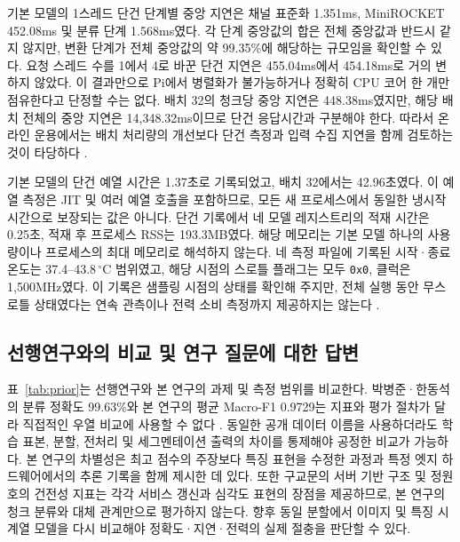 \documentclass[11pt,a4paper]{article}
\newcommand{\sourceproject}{\citep{project2026}}
\newcommand{\smalltable}[1]{\begingroup\small\setlength{\tabcolsep}{5pt}\endgroup}
\begin{document}
\begin{table}[htbp]
\centering
\caption{Pi의 청크당 p50 지연(ms). $t$는 요청 스레드 수, $b$는 배치 크기이다. 배치 8과 32의 값은 전체 배치 지연을 배치 크기로 나눈 처리량 환산값이다.}
\label{tab:latency}
\smalltable{latency.tex}
\end{table}

기본 모델의 1스레드 단건 단계별 중앙 지연은 채널 표준화 1.351ms, MiniROCKET 452.08ms 및 분류 단계 1.568ms였다.
각 단계 중앙값의 합은 전체 중앙값과 반드시 같지 않지만, 변환 단계가 전체 중앙값의 약 99.35\%에 해당하는 규모임을 확인할 수 있다.
요청 스레드 수를 1에서 4로 바꾼 단건 지연은 455.04ms에서 454.18ms로 거의 변하지 않았다.
이 결과만으로 Pi에서 병렬화가 불가능하거나 정확히 CPU 코어 한 개만 점유한다고 단정할 수는 없다.
배치 32의 청크당 중앙 지연은 448.38ms였지만, 해당 배치 전체의 중앙 지연은 14,348.32ms이므로 단건 응답시간과 구분해야 한다.
따라서 온라인 운용에서는 배치 처리량의 개선보다 단건 측정과 입력 수집 지연을 함께 검토하는 것이 타당하다 \sourceproject.

기본 모델의 단건 예열 시간은 1.37초로 기록되었고, 배치 32에서는 42.96초였다.
이 예열 측정은 JIT 및 여러 예열 호출을 포함하므로, 모든 새 프로세스에서 동일한 냉시작 시간으로 보장되는 값은 아니다.
단건 기록에서 네 모델 레지스트리의 적재 시간은 0.25초, 적재 후 프로세스 RSS는 193.3MB였다.
해당 메모리는 기본 모델 하나의 사용량이나 프로세스의 최대 메모리로 해석하지 않는다.
네 측정 파일에 기록된 시작·종료 온도는 37.4--43.8\,${}^{\circ}$C 범위였고, 해당 시점의 스로틀 플래그는 모두 \texttt{0x0}, 클럭은 1,500MHz였다.
이 기록은 샘플링 시점의 상태를 확인해 주지만, 전체 실행 동안 무스로틀 상태였다는 연속 관측이나 전력 소비 측정까지 제공하지는 않는다 \sourceproject.

\subsection{선행연구와의 비교 및 연구 질문에 대한 답변}
표~\ref{tab:prior}는 선행연구와 본 연구의 과제 및 측정 범위를 비교한다.
박병준·한동석의 분류 정확도 99.63\%와 본 연구의 평균 Macro-F1 0.9729는 지표와 평가 절차가 달라 직접적인 우열 비교에 사용할 수 없다 \citep{park2024}.
동일한 공개 데이터 이름을 사용하더라도 학습 표본, 분할, 전처리 및 세그멘테이션 출력의 차이를 통제해야 공정한 비교가 가능하다.
본 연구의 차별성은 최고 점수의 주장보다 특징 표현을 수정한 과정과 특정 엣지 하드웨어에서의 추론 기록을 함께 제시한 데 있다.
또한 구교문의 서버 기반 구조 및 정원호의 건전성 지표는 각각 서비스 갱신과 심각도 표현의 장점을 제공하므로, 본 연구의 청크 분류와 대체 관계만으로 평가하지 않는다.
향후 동일 분할에서 이미지 및 특징 시계열 모델을 다시 비교해야 정확도·지연·전력의 실제 절충을 판단할 수 있다.
\end{document}
